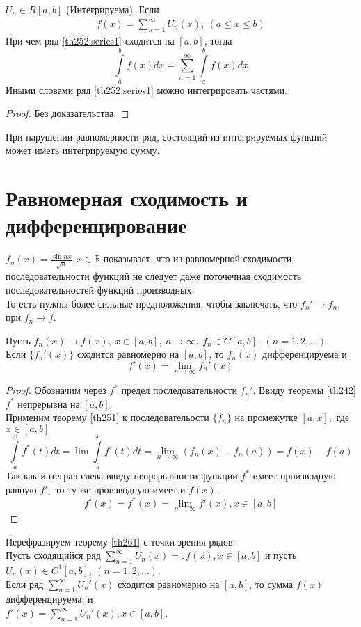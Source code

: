 \begin{theorem}
  $U_n \in R[a,b]$ (Интегрируема). Если
  \begin{gather}
    f(x) = \sum\limits_{n = 1}^{\infty} U_n(x), \ (a \leq x \leq b)
    \label{th252:series1}
  \end{gather}
  При чем ряд \ref{th252:series1} сходится на $[a,b]$, тогда
  $$\int\limits_a^b f(x) dx = \sum\limits_{n = 1}^{\infty} \int\limits_a^b
  f(x) dx$$
  Иными словами ряд \ref{th252:series1} можно интегрировать частями.
\end{theorem}

\begin{proof}
  Без доказательства.
\end{proof}

\begin{remark}
  При нарушении равномерности ряд, состоящий из интегрируемых функций может
  иметь интегрируемую сумму.
\end{remark}

\section{Равномерная сходимость и дифференцирование}
$f_n(x) = \frac{\sin nx}{\sqrt{n}}, x \in \mathbb{R}$ показывает, что из
равномерной сходимости последовательности функций не следует даже поточечная
сходимость последовательностей функций производных. \\
То есть нужны более сильные предположения, чтобы заключать, что $f_n' \to f_n$,
при $f_n \to f$.

\begin{theorem}
  \label{th261}
  Пусть $f_n(x) \to f(x), \ x \in [a,b], \ n \to \infty, \ f_n \in C[a,b], \
  (n = 1, 2, \dots)$. \\
  Если $\{f_n'(x)\}$ сходится равномерно на $[a,b]$, то $f_n(x)$ дифференцируема
  и $$f'(x) = \lim\limits_{n \to \infty} f_n'(x)$$
\end{theorem}

\begin{proof}
  Обозначим через $f^*$ предел последовательности $f_n'$. Ввиду теоремы \ref{th242}
  $f^*$ непрерывна на $[a,b]$. \\
  Применим теорему \ref{th251} к последовательости $\{f_n\}$ на промежутке
  $[a, x],$ где $x \in [a,b]$
  $$\int\limits_a^x f^*(t) dt = \lim \int\limits_a^x f'(t) dt =
  \lim\limits_{n \to \infty} (f_n(x) - f_n(a)) = f(x) - f(a)$$
  Так как интеграл слева ввиду непрерывности функции $f^*$ имеет производную
  равную $f',$ то ту же производную имеет и $f(x)$.
  $$f'(x) = f^*(x) = \lim\limits_{n \to \infty} f'(x), x \in [a,b]$$
\end{proof}

Перефразируем теорему \ref{th261} с точки зрения рядов: \\
Пусть сходящийся ряд $\sum\limits_{n = 1}^{\infty} U_n(x) =: f(x), x \in [a,b]$
и пусть $U_n(x) \in C^1[a,b], \ (n = 1, 2, \dots)$.\\
Если ряд $\sum\limits_{n = 1}^{\infty} U_n'(x)$ сходится равномерно на $[a,b]$,
то сумма $f(x)$ дифференцируема, и \\
$f'(x) = \sum\limits_{n = 1}^{\infty} U_n'(x), x \in [a,b]$.

